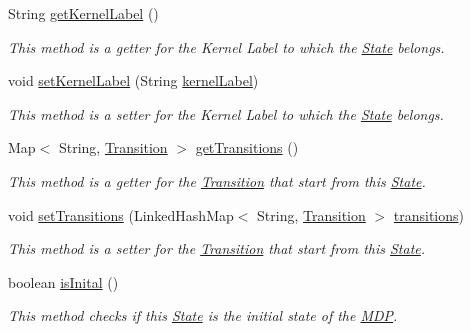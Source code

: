 \begin{DoxyCompactItemize}
String \hyperlink{classmdp_1_1core_1_1_state_a4711a7ffeeede0edcf72550c1eee52e2}{get\+Kernel\+Label} ()
\begin{DoxyCompactList}\small\item\em This method is a getter for the Kernel Label to which the \hyperlink{classmdp_1_1core_1_1_state}{State} belongs. \end{DoxyCompactList}\item 
void \hyperlink{classmdp_1_1core_1_1_state_ab89e4fdb360297c41b3f5ca27a1978fc}{set\+Kernel\+Label} (String \hyperlink{classmdp_1_1core_1_1_state_ac7ca184df7a0ec4141766692290c18ab}{kernel\+Label})
\begin{DoxyCompactList}\small\item\em This method is a setter for the Kernel Label to which the \hyperlink{classmdp_1_1core_1_1_state}{State} belongs. \end{DoxyCompactList}\item 
Map$<$ String, \hyperlink{classmdp_1_1core_1_1_transition}{Transition} $>$ \hyperlink{classmdp_1_1core_1_1_state_ac681391ac0108f110904ed170911b3e1}{get\+Transitions} ()
\begin{DoxyCompactList}\small\item\em This method is a getter for the \hyperlink{classmdp_1_1core_1_1_transition}{Transition} that start from this \hyperlink{classmdp_1_1core_1_1_state}{State}. \end{DoxyCompactList}\item 
void \hyperlink{classmdp_1_1core_1_1_state_af9bbbf26a131aa1f43d7fdf7003b5de1}{set\+Transitions} (Linked\+Hash\+Map$<$ String, \hyperlink{classmdp_1_1core_1_1_transition}{Transition} $>$ \hyperlink{classmdp_1_1core_1_1_state_a3c9b563199f7e235fe083b0d16da8cf3}{transitions})
\begin{DoxyCompactList}\small\item\em This method is a setter for the \hyperlink{classmdp_1_1core_1_1_transition}{Transition} that start from this \hyperlink{classmdp_1_1core_1_1_state}{State}. \end{DoxyCompactList}\item 
boolean \hyperlink{classmdp_1_1core_1_1_state_a73d705b956da58cfedc4d9adf406a000}{is\+Inital} ()
\begin{DoxyCompactList}\small\item\em This method checks if this \hyperlink{classmdp_1_1core_1_1_state}{State} is the initial state of the \hyperlink{classmdp_1_1core_1_1_m_d_p}{M\+D\+P}. \end{DoxyCompactList}\item 

\end{DoxyCompactItemize}
